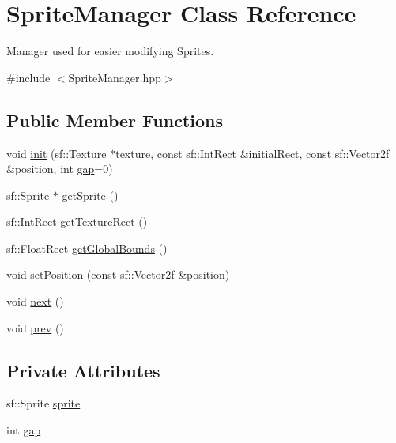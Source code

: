 \hypertarget{class_sprite_manager}{}\section{Sprite\+Manager Class Reference}
\label{class_sprite_manager}


Manager used for easier modifying Sprites.  




{\ttfamily \#include $<$Sprite\+Manager.\+hpp$>$}

\subsection*{Public Member Functions}
\begin{DoxyCompactItemize}
\item 
void \mbox{\hyperlink{class_sprite_manager_a6bc9f6b77d54099de6fcf84ec1e360bd}{init}} (sf\+::\+Texture $\ast$texture, const sf\+::\+Int\+Rect \&initial\+Rect, const sf\+::\+Vector2f \&position, int \mbox{\hyperlink{class_sprite_manager_a57bba66a27411c59651af826b50ec11d}{gap}}=0)
\item 
sf\+::\+Sprite $\ast$ \mbox{\hyperlink{class_sprite_manager_a9c0af555f22c9ea83a07ae3d1818db0e}{get\+Sprite}} ()
\item 
sf\+::\+Int\+Rect \mbox{\hyperlink{class_sprite_manager_af51994d0f3a5e847a8c55bb022f8b1e2}{get\+Texture\+Rect}} ()
\item 
sf\+::\+Float\+Rect \mbox{\hyperlink{class_sprite_manager_af4b1373fb34c1bf091e5023fe52c1bc0}{get\+Global\+Bounds}} ()
\item 
void \mbox{\hyperlink{class_sprite_manager_a9ef427743db56baec20673d877a63717}{set\+Position}} (const sf\+::\+Vector2f \&position)
\item 
void \mbox{\hyperlink{class_sprite_manager_acdcd181f96ed049db0bf445a71e4b6e2}{next}} ()
\item 
void \mbox{\hyperlink{class_sprite_manager_a45d2b2613bb95d34ce8e0ad28e261ef1}{prev}} ()
\end{DoxyCompactItemize}
\subsection*{Private Attributes}
\begin{DoxyCompactItemize}
\item 
sf\+::\+Sprite \mbox{\hyperlink{class_sprite_manager_aaa4c24e6db93bef8a28b38cb8de839c1}{sprite}}
\item 
int \mbox{\hyperlink{class_sprite_manager_a57bba66a27411c59651af826b50ec11d}{gap}}
\end{DoxyCompactItemize}


